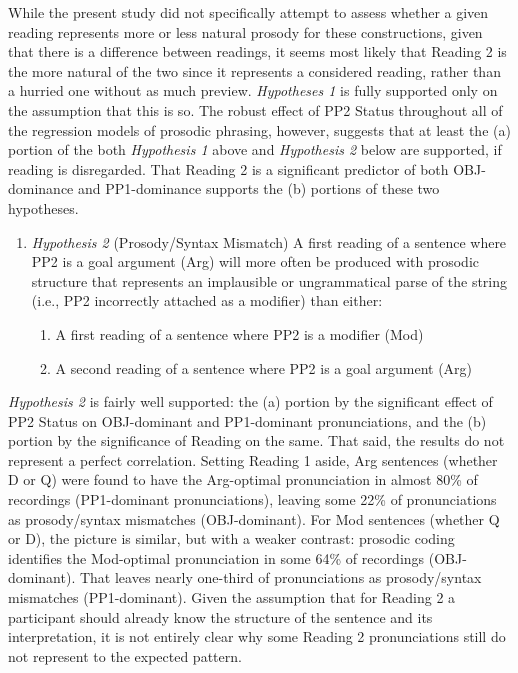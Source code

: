 \documentclass[11pt,oneside]{book}
\providecommand{\tightlist}{%
  \setlength{\itemsep}{0pt}\setlength{\parskip}{0pt}}
\begin{document}
While the present study did not specifically attempt to assess whether a given reading represents more or less natural prosody for these constructions, given that there is a difference between readings, it seems most likely that Reading 2 is the more natural of the two since it represents a considered reading, rather than a hurried one without as much preview. \emph{Hypotheses 1} is fully supported only on the assumption that this is so. The robust effect of PP2 Status throughout all of the regression models of prosodic phrasing, however, suggests that at least the (a) portion of the both \emph{Hypothesis 1} above and \emph{Hypothesis 2} below are supported, if reading is disregarded. That Reading 2 is a significant predictor of both OBJ-dominance and PP1-dominance supports the (b) portions of these two hypotheses.

\begin{enumerate}
\def\labelenumi{(\arabic{enumi})}
\setcounter{enumi}{42}
\tightlist
\item
  \emph{Hypothesis 2} (Prosody/Syntax Mismatch)\linebreak\nopagebreak
  A first reading of a sentence where PP2 is a goal argument (Arg) will more often be produced with prosodic structure that represents an implausible or ungrammatical parse of the string (i.e., PP2 incorrectly attached as a modifier) than either:

  \begin{enumerate}
  \def\labelenumii{\alph{enumii}.}
  \tightlist
  \item
    A first reading of a sentence where PP2 is a modifier (Mod)
  \item
    A second reading of a sentence where PP2 is a goal argument (Arg)
  \end{enumerate}
\end{enumerate}

\emph{Hypothesis 2} is fairly well supported: the (a) portion by the significant effect of PP2 Status on OBJ-dominant and PP1-dominant pronunciations, and the (b) portion by the significance of Reading on the same. That said, the results do not represent a perfect correlation. Setting Reading 1 aside, Arg sentences (whether D or Q) were found to have the Arg-optimal pronunciation in almost 80\% of recordings (PP1-dominant pronunciations), leaving some 22\% of pronunciations as prosody/syntax mismatches (OBJ-dominant). For Mod sentences (whether Q or D), the picture is similar, but with a weaker contrast: prosodic coding identifies the Mod-optimal pronunciation in some 64\% of recordings (OBJ-dominant). That leaves nearly one-third of pronunciations as prosody/syntax mismatches (PP1-dominant). Given the assumption that for Reading 2 a participant should already know the structure of the sentence and its interpretation, it is not entirely clear why some Reading 2 pronunciations still do not represent to the expected pattern.
\end{document}
